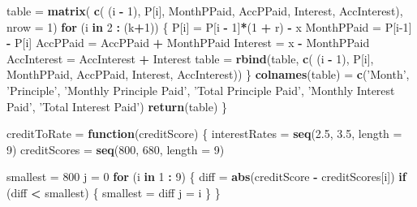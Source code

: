 \documentclass[12pt]{article}
\newenvironment{Section}[1]{}{\newpage}
\newenvironment{Shaded}{\begin{snugshade}}{\end{snugshade}}
\newcommand{\ControlFlowTok}[1]{\textcolor[rgb]{0.13,0.29,0.53}{\textbf{#1}}}
\newcommand{\DataTypeTok}[1]{\textcolor[rgb]{0.13,0.29,0.53}{#1}}
\newcommand{\DecValTok}[1]{\textcolor[rgb]{0.00,0.00,0.81}{#1}}
\newcommand{\FloatTok}[1]{\textcolor[rgb]{0.00,0.00,0.81}{#1}}
\newcommand{\KeywordTok}[1]{\textcolor[rgb]{0.13,0.29,0.53}{\textbf{#1}}}
\newcommand{\NormalTok}[1]{#1}
\newcommand{\OperatorTok}[1]{\textcolor[rgb]{0.81,0.36,0.00}{\textbf{#1}}}
\newcommand{\StringTok}[1]{\textcolor[rgb]{0.31,0.60,0.02}{#1}}
\begin{document}
\begin{Section}{Example A}
\begin{singlespace}
\begin{Shaded}
\begin{Highlighting}[]
\NormalTok{  table =}\StringTok{ }\KeywordTok{matrix}\NormalTok{( }\KeywordTok{c}\NormalTok{( (i }\OperatorTok{-}\StringTok{ }\DecValTok{1}\NormalTok{), P[i], MonthPPaid, AccPPaid, Interest,}
\NormalTok{                     AccInterest), }\DataTypeTok{nrow =} \DecValTok{1}\NormalTok{)}
  \ControlFlowTok{for}\NormalTok{ (i }\ControlFlowTok{in} \DecValTok{2} \OperatorTok{:}\StringTok{ }\NormalTok{(k}\OperatorTok{+}\DecValTok{1}\NormalTok{)) \{}
\NormalTok{    P[i] =}\StringTok{ }\NormalTok{P[i }\OperatorTok{-}\StringTok{ }\DecValTok{1}\NormalTok{]}\OperatorTok{*}\NormalTok{(}\DecValTok{1} \OperatorTok{+}\StringTok{ }\NormalTok{r) }\OperatorTok{-}\StringTok{ }\NormalTok{x}
\NormalTok{    MonthPPaid =}\StringTok{ }\NormalTok{P[i}\DecValTok{-1}\NormalTok{] }\OperatorTok{-}\StringTok{ }\NormalTok{P[i]}
\NormalTok{    AccPPaid =}\StringTok{ }\NormalTok{AccPPaid }\OperatorTok{+}\StringTok{ }\NormalTok{MonthPPaid}
\NormalTok{    Interest =}\StringTok{ }\NormalTok{x }\OperatorTok{-}\StringTok{ }\NormalTok{MonthPPaid}
\NormalTok{    AccInterest =}\StringTok{ }\NormalTok{AccInterest }\OperatorTok{+}\StringTok{ }\NormalTok{Interest}
\NormalTok{    table =}\StringTok{ }\KeywordTok{rbind}\NormalTok{(table, }\KeywordTok{c}\NormalTok{( (i }\OperatorTok{-}\StringTok{ }\DecValTok{1}\NormalTok{), P[i], MonthPPaid, AccPPaid, Interest,}
\NormalTok{                     AccInterest))}
\NormalTok{  \}}
  \KeywordTok{colnames}\NormalTok{(table) =}\StringTok{ }\KeywordTok{c}\NormalTok{(}\StringTok{'Month'}\NormalTok{, }\StringTok{'Principle'}\NormalTok{, }\StringTok{'Monthly Principle Paid'}\NormalTok{, }
  \StringTok{'Total Principle Paid'}\NormalTok{, }\StringTok{'Monthly Interest Paid'}\NormalTok{, }
  \StringTok{'Total Interest Paid'}\NormalTok{)}
  \KeywordTok{return}\NormalTok{(table)}
\NormalTok{\}}
\end{Highlighting}
\end{Shaded}
\newpage
\begin{Shaded}
\begin{Highlighting}
\NormalTok{creditToRate =}\StringTok{ }\ControlFlowTok{function}\NormalTok{(creditScore) \{}
\NormalTok{  interestRates =}\StringTok{ }\KeywordTok{seq}\NormalTok{(}\FloatTok{2.5}\NormalTok{, }\FloatTok{3.5}\NormalTok{, }\DataTypeTok{length =} \DecValTok{9}\NormalTok{) }
\NormalTok{  creditScores =}\StringTok{ }\KeywordTok{seq}\NormalTok{(}\DecValTok{800}\NormalTok{, }\DecValTok{680}\NormalTok{, }\DataTypeTok{length =} \DecValTok{9}\NormalTok{)}

\NormalTok{  smallest =}\StringTok{ }\DecValTok{800}
\NormalTok{  j =}\StringTok{ }\DecValTok{0}
  \ControlFlowTok{for}\NormalTok{ (i }\ControlFlowTok{in} \DecValTok{1} \OperatorTok{:}\StringTok{ }\DecValTok{9}\NormalTok{) \{}
\NormalTok{    diff =}\StringTok{ }\KeywordTok{abs}\NormalTok{(creditScore }\OperatorTok{-}\StringTok{ }\NormalTok{creditScores[i])}
    \ControlFlowTok{if}\NormalTok{ (diff }\OperatorTok{<}\StringTok{ }\NormalTok{smallest) \{}
\NormalTok{      smallest =}\StringTok{ }\NormalTok{diff}
\NormalTok{      j =}\StringTok{ }\NormalTok{i}
\NormalTok{    \}}
\NormalTok{  \}}


\end{Highlighting}
\end{Shaded}
\end{singlespace}
\end{Section}
\end{document}

